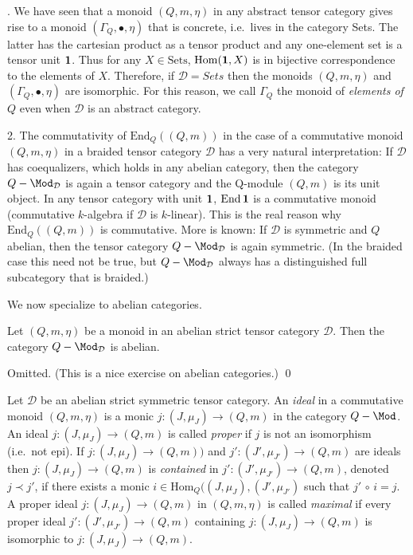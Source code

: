 \documentclass[11pt]{article}
\theoremstyle{definition}
\theoremstyle{definition}
\theoremstyle{remark}
\def\2#1{{\mathcal #1}}
\def\1#1{{\bf #1}}
\newcommand{\Hom}{\mathrm{Hom}}
\newcommand{\End}{\mathrm{End}}
\newcommand{\mcirc}{\,\circ\,}
\newcommand{\rarr}{\rightarrow}
\begin{document}
. We have seen that a monoid $(Q,m,\eta)$ in any abstract tensor category gives rise to a
monoid $(\Gamma_Q,\bullet,\eta)$ that is concrete, i.e.\ lives in the category Sets. The latter has
the cartesian product as a tensor product and any one-element set is a tensor unit $\11$. Thus for
any $X\in\mathrm{Sets}$, $\Hom(\11,X)$ is in bijective correspondence to the elements of
$X$. Therefore, if $\2D=Sets$ then the monoids $(Q,m,\eta)$ and $(\Gamma_Q,\bullet,\eta)$ are
isomorphic. For this reason, we call $\Gamma_Q$ the monoid of \emph{elements of $Q$} even when $\2D$
is an abstract category. 

2. The commutativity of $\End_Q((Q,m))$ in the case of a commutative monoid $(Q,m,\eta)$ in a
braided tensor category $\2D$ has a very natural interpretation: If $\2D$ has coequalizers, which
holds in any abelian category, then the category $Q-\Mod_\2D$ is again a tensor category and the
Q-module $(Q,m)$ is its unit object. In any tensor category with unit $\11$, $\End\,\11$ is a
commutative monoid  (commutative $k$-algebra if $\2D$ is $k$-linear). This is the real reason why
$\End_Q((Q,m))$ is commutative. 
More is known: If $\2D$ is symmetric and $Q$ abelian, then the tensor category $Q-\Mod_\2D$ is again
symmetric. (In the braided case this need not be true, but $Q-\Mod_\2D$ always has a distinguished
full subcategory that is braided.)
\erem

We now specialize to abelian categories.

\bprop
Let $(Q,m,\eta)$ be a monoid in an abelian strict tensor category $\2D$. Then the category
$Q-\Mod_\2D$ is abelian.
\eprop

\prf Omitted. (This is a nice exercise on abelian categories.)
\qed

\bdefin {}
Let $\2D$ be an abelian strict symmetric tensor category.
An \emph{ideal} in a commutative monoid $(Q,m,\eta)$ is a monic $j:(J,\mu_J)\rarr(Q,m)$ in the
category $Q-\Mod$. An ideal $j:(J,\mu_J)\rarr(Q,m)$ is called \emph{proper} if $j$ is not an
isomorphism (i.e.\ not epi). If $j:(J,\mu_J)\rarr(Q,m))$ and $j':(J',\mu_{J'})\rarr(Q,m)$ are ideals
then $j:(J,\mu_J)\rarr(Q,m)$ is \emph{contained} in $j':(J',\mu_{J'})\rarr(Q,m)$, denoted
$j\prec j'$, if there exists a monic $i\in\Hom_Q((J,\mu_J),(J',\mu_{J'})$ such that $j'\mcirc i=j$. 
A proper ideal $j:(J,\mu_J)\rarr(Q,m)$ in $(Q,m,\eta)$ is called \emph{maximal} if every proper
ideal $j':(J',\mu_{J'})\rarr(Q,m)$ containing $j:(J,\mu_J)\rarr(Q,m)$ is isomorphic to
$j:(J,\mu_J)\rarr(Q,m)$.  
\edefin
\end{document}
